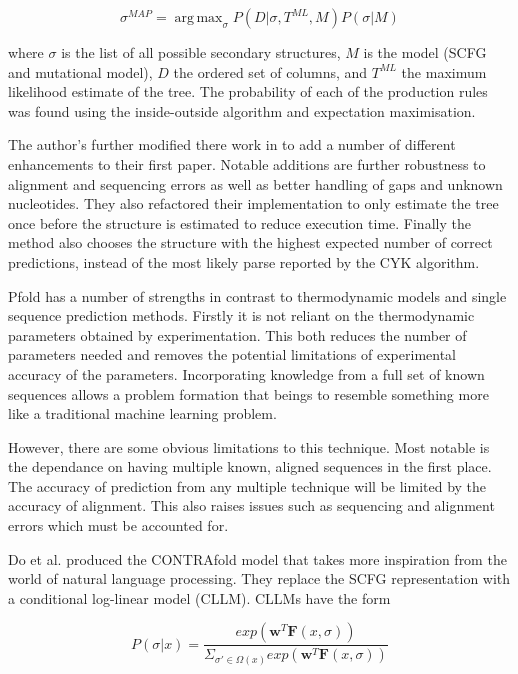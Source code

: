 \documentclass[journal]{IEEEtran}
\DeclareMathOperator*{\argmax}{arg\,max}
\begin{document}
\begin{equation}
	\sigma^{MAP} = \argmax_{\sigma} P(D | \sigma, T^{ML}, M)P(\sigma | M)
\end{equation}

where $\sigma$ is the list of all possible secondary structures, $M$ is the model (SCFG and mutational model), $D$ the ordered set of columns, and $T^{ML}$ the maximum likelihood estimate of the tree. The probability of each of the production rules was found using the inside-outside algorithm and expectation maximisation.

The author's further modified there work in \cite{knudsen2003pfold} to add a number of different enhancements to their first paper. Notable additions are further robustness to alignment and sequencing errors as well as better handling of gaps and unknown nucleotides. They also refactored their implementation to only estimate the tree once before the structure is estimated to reduce execution time. Finally the method also chooses the structure with the highest expected number of correct predictions, instead of the most likely parse reported by the CYK algorithm.

Pfold has a number of strengths in contrast to thermodynamic models and single sequence prediction methods. Firstly it is not reliant on the thermodynamic parameters obtained by experimentation. This both reduces the number of parameters needed and removes the potential limitations of experimental accuracy of the parameters. Incorporating knowledge from a full set of known sequences allows a problem formation that beings to resemble something more like a traditional machine learning problem.

However, there are some obvious limitations to this technique. Most notable is the dependance on having multiple known, aligned sequences in the first place. The accuracy of prediction from any multiple technique will be limited by the accuracy of alignment. This also raises issues such as sequencing and alignment errors which must be accounted for.

Do et al. \cite{do2006contrafold} produced the CONTRAfold model that takes more inspiration from the world of natural language processing. They replace the SCFG representation with a conditional log-linear model (CLLM). CLLMs have the form

\begin{equation}
	\label{eq:cllm}
	P(\sigma|x) = \frac{exp(\mathbf{w}^T \mathbf{F}(x, \sigma))}{\Sigma_{\sigma'\in \Omega(x)} exp(\mathbf{w}^T \mathbf{F}(x, \sigma))} 
\end{equation}
\end{document}

